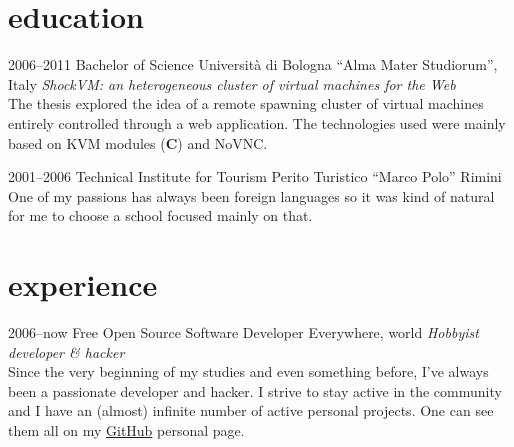 \documentclass[]{friggeri-cv}
\begin{document}
\section{education}

\begin{entrylist}
  \entry
      {2006--2011}
      {Bachelor of Science}
      {Universit\`a di Bologna ``Alma Mater Studiorum'', Italy}
      {\emph{ShockVM: an heterogeneous cluster of virtual machines for the Web}
        \\
        The thesis explored the idea of a remote spawning cluster of virtual
        machines entirely controlled through a web application. The technologies
        used were mainly based on KVM modules (\textbf{C}) and NoVNC.}
\end{entrylist}

\begin{entrylist}
    \entry
      {2001--2006}
      {Technical Institute for Tourism}
      {Perito Turistico ``Marco Polo'' Rimini}
      {One of my passions has always been foreign languages so it was kind of
      natural for me to choose a school focused mainly on that.}
\end{entrylist}


\section{experience}

\begin{entrylist}
  \entry
      {2006--now}
      {Free Open Source Software Developer}
      {Everywhere, world}
      {\emph{Hobbyist developer \& hacker} \\
        Since the very beginning of my studies and even something before, I've
        always been a passionate developer and hacker.  I strive to stay active
        in the community and I have an (almost) infinite number of active personal
        projects.  One can see them all on my \href{https://github.com/massix/}{GitHub}
        personal page.
      }
\end{entrylist}
\end{document}
